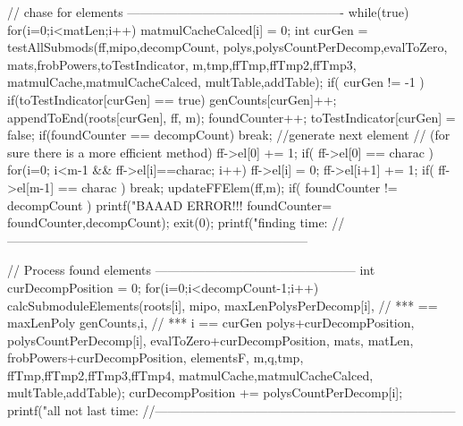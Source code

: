 \begin{ccode}[caption={Aus \url{../Sage/enumeratePCNs.c}},
  label=lst:processFiniteField]
{    // chase for elements ----------------------------------------------------
    while(true){
        for(i=0;i<matLen;i++) matmulCacheCalced[i] = 0;
        int curGen = testAllSubmods(ff,mipo,decompCount,
                polys,polysCountPerDecomp,evalToZero,
                mats,frobPowers,toTestIndicator,
                m,tmp,ffTmp,ffTmp2,ffTmp3,
                matmulCache,matmulCacheCalced,
                multTable,addTable);
        if( curGen != -1 ){
            if(toTestIndicator[curGen] == true){
                genCounts[curGen]++;
                appendToEnd(roots[curGen], ff, m);
                foundCounter++;
                toTestIndicator[curGen] = false;
            }
            if(foundCounter == decompCount) break;
        }
        //generate next element
        // (for sure there is a more efficient method)
        ff->el[0] += 1;
        if( ff->el[0] == charac ){
            for(i=0; i<m-1 && ff->el[i]==charac; i++){
                ff->el[i] = 0;
                ff->el[i+1] += 1;
            }
            if( ff->el[m-1] == charac )
                break;
        }
        updateFFElem(ff,m);
    }
    if( foundCounter != decompCount ){
        printf("BAAAD ERROR!!! foundCounter=%
                foundCounter,decompCount);
        exit(0);
    }
    printf("finding time: %
    //------------------------------------------------------------------------
    


    // Process found elements ------------------------------------------------
    int curDecompPosition = 0;
    for(i=0;i<decompCount-1;i++){
        calcSubmoduleElements(roots[i], mipo,
                maxLenPolysPerDecomp[i],  // *** == maxLenPoly
                genCounts,i, // *** i == curGen
                polys+curDecompPosition, polysCountPerDecomp[i],
                evalToZero+curDecompPosition,
                mats, matLen, frobPowers+curDecompPosition,
                elementsF,
                m,q,tmp,
                ffTmp,ffTmp2,ffTmp3,ffTmp4,
                matmulCache,matmulCacheCalced,
                multTable,addTable);
        curDecompPosition += polysCountPerDecomp[i];
    }
    printf("all not last time: %
    //------------------------------------------------------------------------
    
}
\end{ccode}
